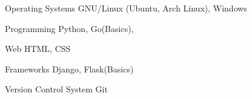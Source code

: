 

\begin{cvskills}

  \cvskill
    {Operating Systems} %
    {GNU/Linux (Ubuntu, Arch Linux), Windows } %

  \cvskill
    {Programming} %
    {Python, Go(Basics),} %

  \cvskill
    {Web} %
    {HTML, CSS} %



  \cvskill
    {Frameworks} %
    {Django, Flask(Basics)} %


  \cvskill
    {Version Control System} %
    {Git} %


\end{cvskills}

